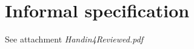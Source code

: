 \documentclass[Main]{subfiles}
\begin{document}
\section{Informal specification}

See attachment \textit{Handin4Reviewed.pdf}
\end{document}
